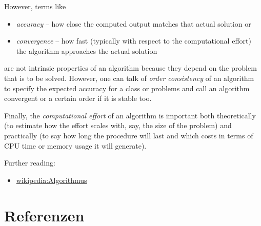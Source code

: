 \documentclass[
]{book}
\providecommand{\tightlist}{%
  \setlength{\itemsep}{0pt}\setlength{\parskip}{0pt}}
\theoremstyle{definition}
\theoremstyle{definition}
\theoremstyle{definition}
\theoremstyle{definition}
\theoremstyle{remark}
\begin{document}
However, terms like

\begin{itemize}
\tightlist
\item
  \emph{accuracy} -- how close the computed output matches that actual solution or
\item
  \emph{convergence} -- how fast (typically with respect to the computational effort) the algorithm approaches the actual solution
\end{itemize}

are not intrinsic properties of an algorithm because they depend on the problem that is to be solved.
However, one can talk of \emph{order consistency} of an algorithm to specify the expected accuracy for a class or problems and call an algorithm convergent or a certain order if it is stable too.

Finally, the \emph{computational effort} of an algorithm is important both theoretically (to estimate how the effort scales with, say, the size of the problem) and practically (to say how long the procedure will last and which costs in terms of CPU time or memory usage it will generate).

Further reading:

\begin{itemize}
\tightlist
\item
  \href{https://de.wikipedia.org/wiki/Algorithmus\#Definition}{wikipedia:Algorithmus}
\end{itemize}

\hypertarget{referenzen}{%
\chapter*{Referenzen}\label{referenzen}}
\end{document}
